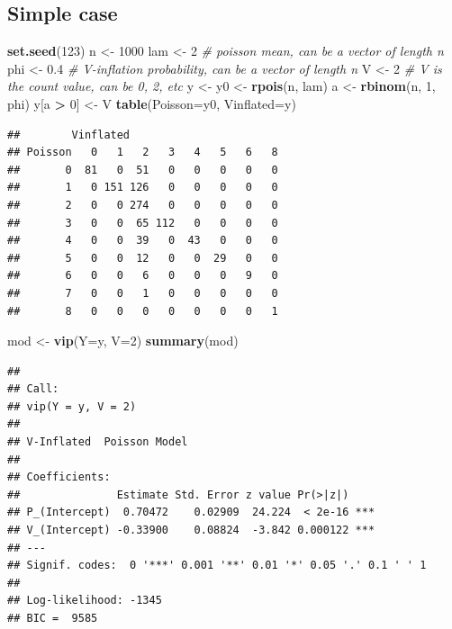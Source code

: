 \documentclass[]{article}
\newenvironment{Shaded}{\begin{snugshade}}{\end{snugshade}}
\newcommand{\KeywordTok}[1]{\textcolor[rgb]{0.13,0.29,0.53}{\textbf{#1}}}
\newcommand{\DataTypeTok}[1]{\textcolor[rgb]{0.13,0.29,0.53}{#1}}
\newcommand{\DecValTok}[1]{\textcolor[rgb]{0.00,0.00,0.81}{#1}}
\newcommand{\FloatTok}[1]{\textcolor[rgb]{0.00,0.00,0.81}{#1}}
\newcommand{\StringTok}[1]{\textcolor[rgb]{0.31,0.60,0.02}{#1}}
\newcommand{\CommentTok}[1]{\textcolor[rgb]{0.56,0.35,0.01}{\textit{#1}}}
\newcommand{\OperatorTok}[1]{\textcolor[rgb]{0.81,0.36,0.00}{\textbf{#1}}}
\newcommand{\NormalTok}[1]{#1}
\begin{document}
\subsection{Simple case}\label{simple-case}

\begin{Shaded}
\begin{Highlighting}[]
\KeywordTok{set.seed}\NormalTok{(}\DecValTok{123}\NormalTok{)}
\NormalTok{n <-}\StringTok{ }\DecValTok{1000}
\NormalTok{lam <-}\StringTok{ }\DecValTok{2} \CommentTok{# poisson mean, can be a vector of length n}
\NormalTok{phi <-}\StringTok{ }\FloatTok{0.4} \CommentTok{# V-inflation probability, can be a vector of length n}
\NormalTok{V <-}\StringTok{ }\DecValTok{2} \CommentTok{# V is the count value, can be 0, 2, etc}
\NormalTok{y <-}\StringTok{ }\NormalTok{y0 <-}\StringTok{ }\KeywordTok{rpois}\NormalTok{(n, lam)}
\NormalTok{a <-}\StringTok{ }\KeywordTok{rbinom}\NormalTok{(n, }\DecValTok{1}\NormalTok{, phi)}
\NormalTok{y[a }\OperatorTok{>}\StringTok{ }\DecValTok{0}\NormalTok{] <-}\StringTok{ }\NormalTok{V}
\KeywordTok{table}\NormalTok{(}\DataTypeTok{Poisson=}\NormalTok{y0, }\DataTypeTok{Vinflated=}\NormalTok{y)}
\end{Highlighting}
\end{Shaded}

\begin{verbatim}
##        Vinflated
## Poisson   0   1   2   3   4   5   6   8
##       0  81   0  51   0   0   0   0   0
##       1   0 151 126   0   0   0   0   0
##       2   0   0 274   0   0   0   0   0
##       3   0   0  65 112   0   0   0   0
##       4   0   0  39   0  43   0   0   0
##       5   0   0  12   0   0  29   0   0
##       6   0   0   6   0   0   0   9   0
##       7   0   0   1   0   0   0   0   0
##       8   0   0   0   0   0   0   0   1
\end{verbatim}

\begin{Shaded}
\begin{Highlighting}[]
\NormalTok{mod <-}\StringTok{ }\KeywordTok{vip}\NormalTok{(}\DataTypeTok{Y=}\NormalTok{y, }\DataTypeTok{V=}\DecValTok{2}\NormalTok{)}
\KeywordTok{summary}\NormalTok{(mod)}
\end{Highlighting}
\end{Shaded}

\begin{verbatim}
## 
## Call:
## vip(Y = y, V = 2)
## 
## V-Inflated  Poisson Model
## 
## Coefficients:
##               Estimate Std. Error z value Pr(>|z|)    
## P_(Intercept)  0.70472    0.02909  24.224  < 2e-16 ***
## V_(Intercept) -0.33900    0.08824  -3.842 0.000122 ***
## ---
## Signif. codes:  0 '***' 0.001 '**' 0.01 '*' 0.05 '.' 0.1 ' ' 1 
## 
## Log-likelihood: -1345 
## BIC =  9585
\end{verbatim}
\end{document}

